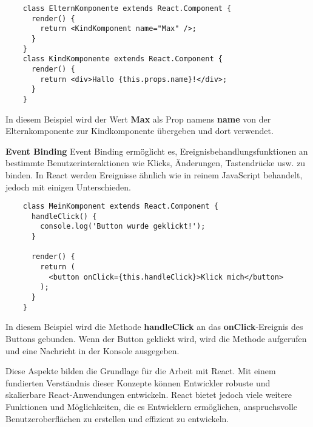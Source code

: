 \begin{lstlisting}
    class ElternKomponente extends React.Component {
      render() {
        return <KindKomponent name="Max" />;
      }
    }
    class KindKomponente extends React.Component {
      render() {
        return <div>Hallo {this.props.name}!</div>;
      }
    }
\end{lstlisting}

In diesem Beispiel wird der Wert \textbf{Max} als Prop namens \textbf{name} von der Elternkomponente zur Kindkomponente übergeben und dort verwendet.

\cite{frontend_web_react_components}

\textbf{Event Binding}
\newline
Event Binding ermöglicht es, Ereignisbehandlungsfunktionen an bestimmte Benutzerinteraktionen wie Klicks, Änderungen, Tastendrücke usw. zu binden. In React werden Ereignisse ähnlich wie in reinem JavaScript behandelt, jedoch mit einigen Unterschieden.

\begin{lstlisting}
    class MeinKomponent extends React.Component {
      handleClick() {
        console.log('Button wurde geklickt!');
      }
    
      render() {
        return (
          <button onClick={this.handleClick}>Klick mich</button>
        );
      }
    }
\end{lstlisting}

In diesem Beispiel wird die Methode \textbf{handleClick} an das \textbf{onClick}-Ereignis des Buttons gebunden. Wenn der Button geklickt wird, wird die Methode aufgerufen und eine Nachricht in der Konsole ausgegeben.

Diese Aspekte bilden die Grundlage für die Arbeit mit React. Mit einem fundierten Verständnis dieser Konzepte können Entwickler robuste und skalierbare React-Anwendungen entwickeln. React bietet jedoch viele weitere Funktionen und Möglichkeiten, die es Entwicklern ermöglichen, anspruchsvolle Benutzeroberflächen zu erstellen und effizient zu entwickeln.


\cite{frontend_web_react_events}